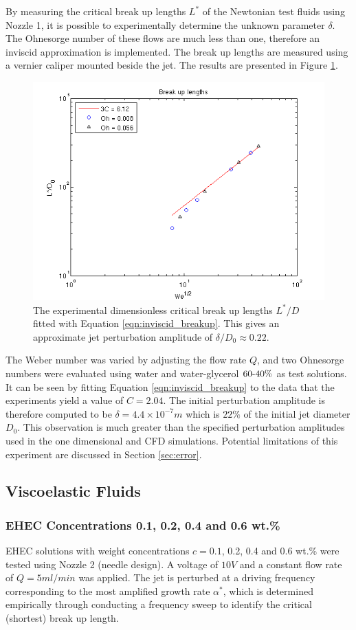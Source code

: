 \documentclass[11pt]{article}
\begin{document}
By measuring the critical break up lengths $L^*$ of the Newtonian test fluids using Nozzle 1, it is possible to experimentally determine the unknown parameter $\delta$. The Ohnesorge number of these flows are much less than one, therefore an inviscid approximation is implemented. The break up lengths are measured using a vernier caliper mounted beside the jet. The results are presented in Figure \ref{fig:breakup}.
\begin{figure}[h]
\centering
	\includegraphics[width = 0.5 \textwidth]{img/breakup.png}
	\caption{The experimental dimensionless critical break up lengths $L^*/D$ fitted with Equation \ref{eqn:inviscid_breakup}. This gives an approximate jet perturbation amplitude of $\delta/D_0 \approx 0.22$.}
	\label{fig:breakup}
\end{figure}

The Weber number was varied by adjusting the flow rate $Q$, and two Ohnesorge numbers were evaluated using water and water-glycerol $60 {\text -} 40 \%$ as test solutions. It can be seen by fitting Equation \ref{eqn:inviscid_breakup} to the data that the experiments yield a value of $C =2.04$. The initial perturbation amplitude is therefore computed to be $\delta = 4.4 \times 10^{-7} m$ which is $22\%$ of the initial jet diameter $D_0$. This observation is much greater than the specified perturbation amplitudes used in the one dimensional and CFD simulations. Potential limitations of this experiment are discussed in Section \ref{sec:error}. 

\subsection{Viscoelastic Fluids}

\subsubsection{EHEC Concentrations 0.1, 0.2, 0.4 and 0.6 wt.\%} \label{sec:EHEC}
EHEC solutions with weight concentrations $c=0.1$, 0.2, 0.4 and 0.6 wt.\% were tested using Nozzle 2 (needle design). A voltage of $10V$ and a constant flow rate of $Q = 5ml/min$ was applied. The jet is perturbed at a driving frequency corresponding to the most amplified growth rate $\alpha^*$, which is determined empirically through conducting a frequency sweep to identify the critical (shortest) break up length.
\end{document}
